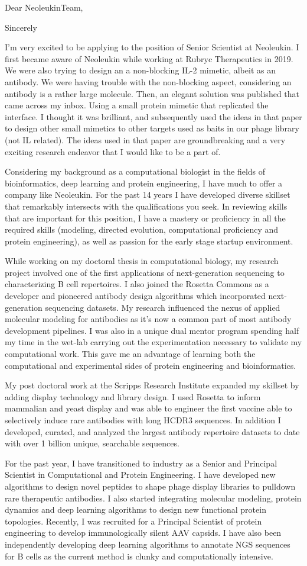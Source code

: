 \documentclass[11pt,a4paper,sans]{moderncv}        %
\title{}                               %
\newcommand{\Position}{Senior Scientist }
\newcommand{\Company}{Neoleukin}
\newcommand{\CompanyLoc}{Seattle}
\newcommand{\CompanyState}{WA}
\newcommand{\Personal}{I first became aware of Neoleukin while working at Rubryc Therapeutics in 2019. We were also trying to design an a non-blocking  IL-2 mimetic, albeit as an antibody. We were having trouble with the non-blocking aspect, considering an antibody is a rather large molecule. Then, an elegant solution was published that came across my inbox. Using a small  protein mimetic that replicated the interface. I thought it was brilliant, and subsequently used the ideas in that paper to design other small mimetics to other targets used as baits in our phage library (not IL related). The ideas used in that paper are groundbreaking and a very exciting research endeavor that I would like to be a part of.}
\newcommand{\skills}{modeling, directed evolution, computational proficiency and protein engineering}
\begin{document}
\recipient{\Company Team}{\CompanyLoc \\ \CompanyLoc, \CompanyState}
\date{2020}
\opening{Dear \Company Team,}
\closing{Sincerely}
\makelettertitle
\justify
I'm very excited to be applying to the position of \Position at \Company. \Personal

Considering my background as a computational biologist in the fields of bioinformatics, deep learning and protein engineering, I have much to offer a company like \Company.
For the past 14 years I have developed diverse skillset that remarkably intersects with the qualifications you seek. In reviewing skills that are important for this position, I have a mastery or proficiency in all the required skills (\skills), as well as passion for the early stage startup environment.

While working on my doctoral thesis in computational biology, my research project involved one of the first applications of next-generation sequencing to characterizing B cell repertoires. 
I also joined the Rosetta Commons as a developer and pioneered antibody design algorithms which incorporated next-generation sequencing datasets. My research influenced the nexus of applied molecular modeling for antibodies as it's now a common part of most antibody development pipelines. I was also in a unique dual mentor program spending half my time in the wet-lab carrying out the experimentation necessary to validate my computational work. This gave me an advantage of learning both the computational and experimental sides of protein engineering and bioinformatics.

My post doctoral work at the Scripps Research Institute expanded my skillset by adding display technology and library design. I used Rosetta to inform mammalian and yeast  display and was able to engineer the first vaccine able to selectively induce rare antibodies with long HCDR3 sequences.  In addition I developed, curated, and analyzed the largest antibody repertoire datasets to date with over 1 billion unique, searchable sequences.

For the past year, I have transitioned to industry as a Senior and Principal Scientist in Computational and Protein Engineering. I have developed new algorithms to design novel peptides to shape phage display libraries to pulldown rare therapeutic antibodies. I also started integrating molecular modeling, protein dynamics and deep learning algorithms to design new functional protein topologies. Recently, I was recruited for a Principal Scientist of protein engineering to develop immunologically silent AAV capsids. I have also been independently developing deep learning algorithms to annotate NGS sequences for B cells as the current method is clunky and computationally intensive.
\end{document}
